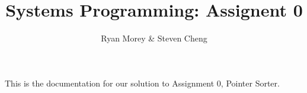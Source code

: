 \documentclass{article}
\title{Systems Programming: Assignent 0}
\author{Ryan Morey & Steven Cheng}
\begin{document}
This is the documentation for our solution to Assignment 0, Pointer Sorter.
\end{document}
